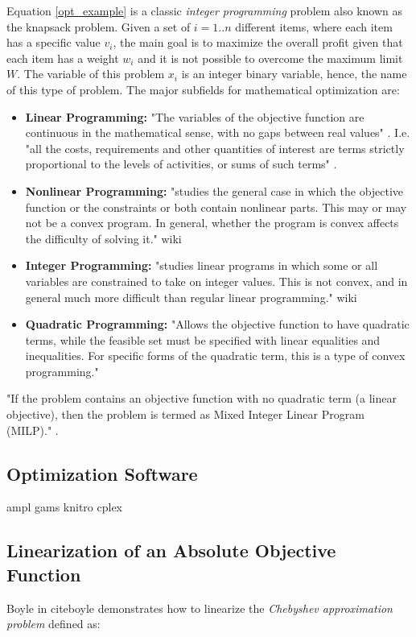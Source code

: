 Equation \eqref{opt_example} is a classic \textit{integer programming} problem also known as the knapsack problem. Given a set of $i = 1..n$ different items, where each item has a specific value $v_i$, the main goal is to maximize the overall profit given that each item has a weight $w_i$ and it is not possible to overcome the maximum limit $W$. The variable of this problem $x_i$ is an integer binary variable, hence, the name of this type of problem. The major subfields for mathematical optimization are:
\begin{itemize}
    \item \textbf{Linear Programming:} "The variables of the objective function are continuous in the mathematical sense, with no gaps between real values" \cite{cplex}. I.e. "all the costs, requirements and other quantities of interest are terms strictly proportional to the levels of activities, or sums of such terms" \cite{ampl}. 
    \item \textbf{Nonlinear Programming:} "studies the general case in which the objective function or the constraints or both contain nonlinear parts. This may or may not be a convex program. In general, whether the program is convex affects the difficulty of solving it." wiki
    \item \textbf{Integer Programming:} "studies linear programs in which some or all variables are constrained to take on integer values. This is not convex, and in general much more difficult than regular linear programming." wiki
    \item \textbf{Quadratic Programming:} "Allows the objective function to have quadratic terms, while the feasible set must be specified with linear equalities and inequalities. For specific forms of the quadratic term, this is a type of convex programming."
\end{itemize}

"If the problem contains an objective function with no quadratic term (a linear objective), then the problem is termed as Mixed Integer Linear Program (MILP)." \cite{cplex}. 

\subsection{Optimization Software}
ampl
gams
knitro
cplex

\subsection{Linearization of an Absolute Objective Function}
Boyle in cite{boyle} demonstrates how to linearize the \textit{Chebyshev approximation problem} defined as:

